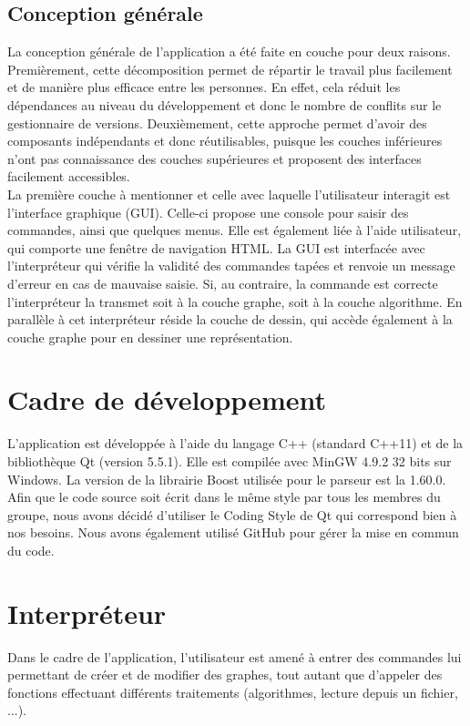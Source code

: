 \documentclass[french]{article}
\begin{document}
		\subsection{Conception générale}
		La conception générale de l'application a été faite en couche pour deux raisons. Premièrement, cette décomposition permet de répartir le travail plus facilement et de manière plus efficace entre les personnes. En effet, cela réduit les dépendances au niveau du développement et donc le nombre de conflits sur le gestionnaire de versions. Deuxièmement, cette approche permet d'avoir des composants indépendants et donc réutilisables, puisque les couches inférieures n'ont pas connaissance des couches supérieures et proposent des interfaces facilement accessibles.\\
		La première couche à mentionner et celle avec laquelle l'utilisateur interagit est l'interface graphique (GUI). Celle-ci propose une console pour saisir des commandes, ainsi que quelques menus. Elle est également liée à l'aide utilisateur, qui comporte une fenêtre de navigation HTML. La GUI est interfacée avec l'interpréteur qui vérifie la validité des commandes tapées et renvoie un message d'erreur en cas de mauvaise saisie. Si, au contraire, la commande est correcte l'interpréteur la transmet soit à la couche graphe, soit à la couche algorithme. En parallèle à cet interpréteur réside la couche de dessin, qui accède également à la couche graphe pour en dessiner une représentation.
	
	\section{Cadre de développement} 
		L'application est développée à l'aide du langage C++ (standard C++11) et de la bibliothèque Qt (version 5.5.1). Elle est compilée avec MinGW 4.9.2 32 bits sur Windows. La version de la librairie Boost utilisée pour le parseur est la 1.60.0. Afin que le code source soit écrit dans le même style par tous les membres du groupe, nous avons décidé d'utiliser le Coding Style de Qt \cite{qtStyle} qui correspond bien à nos besoins. Nous avons également utilisé GitHub pour gérer la mise en commun du code.
			
	\section{Interpréteur} %
		Dans le cadre de l'application, l'utilisateur est amené à entrer des commandes lui permettant de créer et de modifier des graphes, tout autant que d'appeler des fonctions effectuant différents traitements (algorithmes, lecture depuis un fichier, ...). 
	
\end{document}
